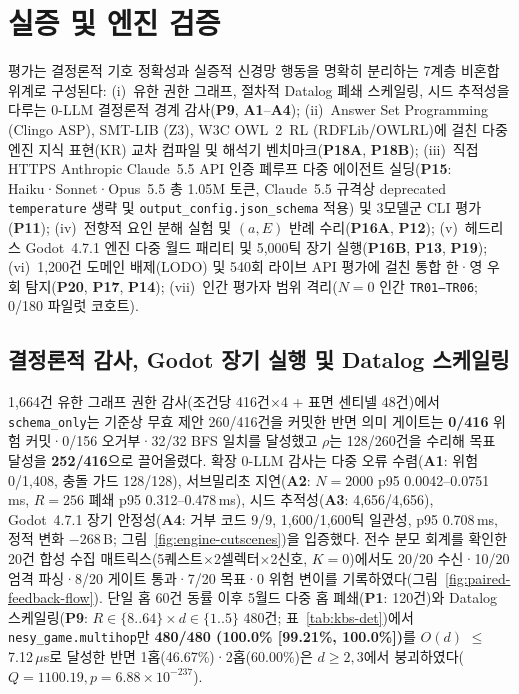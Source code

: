 \section{실증 및 엔진 검증}\label{sec:eval}
\system{} 평가는 결정론적 기호 정확성과 실증적 신경망 행동을 명확히 분리하는 7계층 비혼합 위계로 구성된다:
(i)~유한 권한 그래프, 절차적 Datalog 폐쇄 스케일링, 시드 추적성을 다루는 0-LLM 결정론적 경계 감사(\textbf{P9}, \textbf{A1}--\textbf{A4});
(ii)~Answer Set Programming (Clingo ASP), SMT-LIB (Z3), W3C OWL~2~RL (RDFLib/OWLRL)에 걸친 다중 엔진 지식 표현(KR) 교차 컴파일 및 해석기 벤치마크(\textbf{P18A}, \textbf{P18B});
(iii)~직접 HTTPS Anthropic Claude~5.5 API 인증 폐루프 다중 에이전트 실딩(\textbf{P15}: Haiku·Sonnet·Opus~5.5 총 1.05M 토큰, Claude~5.5 규격상 deprecated \texttt{temperature} 생략 및 \texttt{output\_config.json\_schema} 적용) 및 3모델군 CLI 평가(\textbf{P11});
(iv)~전향적 요인 분해 실험 및 $(a,E)$ 반례 수리(\textbf{P16A}, \textbf{P12});
(v)~헤드리스 Godot~4.7.1 엔진 다중 월드 패리티 및 5,000틱 장기 실행(\textbf{P16B}, \textbf{P13}, \textbf{P19});
(vi)~1,200건 도메인 배제(LODO) 및 540회 라이브 API 평가에 걸친 통합 한·영 우회 탐지(\textbf{P20}, \textbf{P17}, \textbf{P14});
(vii)~인간 평가자 범위 격리($N{=}0$ 인간 \texttt{TR01--TR06}; 0/180 파일럿 코호트).

\subsection{결정론적 감사, Godot 장기 실행 및 Datalog 스케일링}\label{sec:kbs-det}
1,664건 유한 그래프 권한 감사(조건당 416건$\times$4 + 표면 센티넬 48건)에서 \texttt{schema\_only}는 기준상 무효 제안 260/416건을 커밋한 반면 의미 게이트는 \textbf{0/416} 위험 커밋·0/156 오거부·32/32 BFS 일치를 달성했고 $\rho$는 128/260건을 수리해 목표 달성을 \textbf{252/416}으로 끌어올렸다. 확장 0-LLM 감사는 다중 오류 수렴(\textbf{A1}: 위험 0/1,408, 충돌 가드 128/128), 서브밀리초 지연(\textbf{A2}: $N{=}2000$ p95 0.0042--0.0751\,ms, $R{=}256$ 폐쇄 p95 0.312--0.478\,ms), 시드 추적성(\textbf{A3}: 4,656/4,656), Godot~4.7.1 장기 안정성(\textbf{A4}: 거부 코드 9/9, 1,600/1,600틱 일관성, p95 0.708\,ms, 정적 변화 $-268$\,B; 그림~\ref{fig:engine-cutscenes})을 입증했다. 전수 분모 회계를 확인한 20건 합성 수집 매트릭스(5퀘스트$\times$2셀렉터$\times$2신호, $K{=}0$)에서도 20/20 수신·10/20 엄격 파싱·8/20 게이트 통과·7/20 목표·0 위험 변이를 기록하였다(그림~\ref{fig:paired-feedback-flow}). 단일 홉 60건 동률 이후 5월드 다중 홉 폐쇄(\textbf{P1}: 120건)와 Datalog 스케일링(\textbf{P9}: $R\in\{8..64\}\times d\in\{1..5\}$ 480건; 표~\ref{tab:kbs-det})에서 \texttt{nesy\_game.multihop}만 \textbf{480/480 (100.0\% [99.21\%, 100.0\%])}를 $O(d)$ $\le$7.12\,$\mu$s로 달성한 반면 1홉(46.67\%)·2홉(60.00\%)은 $d{\ge}2,3$에서 붕괴하였다($Q{=}1100.19, p{=}6.88{\times}10^{-237}$).

